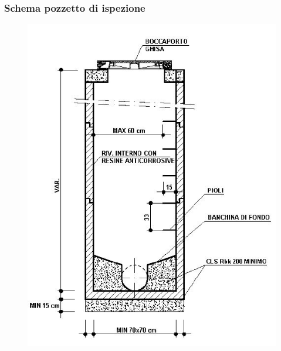 \documentclass{beamer}
\begin{document}
\begin{frame}
 \frametitle{Schema pozzetto di ispezione}
 \begin{figure}
  \centering
  \includegraphics[height=.8\textheight]{images/pozzetto}
 \end{figure}
\end{frame}
\end{document}
